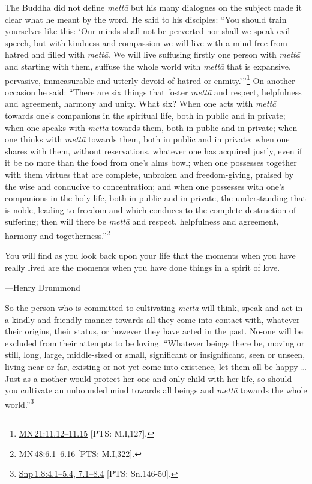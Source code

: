 \documentclass[10pt, openright]{book}
\newenvironment{epigram-2}%
{%
\vspace{1em}
\noindent
\quoting[leftmargin=2.5cm,rightmargin=2.5cm]%
\begin{itshape}
\large
}%
{\end{itshape}\endquoting
}%
\newenvironment{epigram-2-cite}%
{%
\quoting[leftmargin=2.5cm,rightmargin=2.5cm]%
\noindent\normal\hspace*{\fill} 
}%
{\endquoting\vspace{1em}
}%
\begin{document}
The Buddha did not define \textit{mettā} but his many dialogues on the subject made it clear what he meant by the word. He said to his disciples: “You should train yourselves like this: ‘Our minds shall not be perverted nor shall we speak evil speech, but with kindness and compassion we will live with a mind free from hatred and filled with \textit{mettā}. We will live suffusing firstly one person with \textit{mettā} and starting with them, suffuse the whole world with \textit{mettā} that is expansive, pervasive, immeasurable and utterly devoid of hatred or enmity.’”\footnote {\href{https://suttacentral.net/mn21/en/sujato\#11.12}{MN 21:11.12–11.15} [PTS: M.I,127].} On another occasion he said: “There are six things that foster \textit{mettā} and respect, helpfulness and agreement, harmony and unity. What six? When one acts with \textit{mettā} towards one’s companions in the spiritual life, both in public and in private; when one speaks with \textit{mettā} towards them, both in public and in private; when one thinks with \textit{mettā} towards them, both in public and in private; when one shares with them, without reservations, whatever one has acquired justly, even if it be no more than the food from one’s alms bowl; when one possesses together with them virtues that are complete, unbroken and freedom-giving, praised by the wise and conducive to concentration; and when one possesses with one’s companions in the holy life, both in public and in private, the understanding that is noble, leading to freedom and which conduces to the complete destruction of suffering; then will there be \textit{mettā} and respect, helpfulness and agreement, harmony and togetherness.”\footnote {\href{https://suttacentral.net/mn48/en/sujato\#6.1}{MN 48:6.1–6.16} [PTS: M.I,322].}


\begin{epigram-2}
You will find as you look back upon your life that the moments when you have really lived are the moments when you have done things in a spirit of love.
\end{epigram-2}

\begin{epigram-2-cite}
—Henry Drummond
\end{epigram-2-cite}

So the person who is committed to cultivating \textit{mettā} will think, speak and act in a kindly and friendly manner towards all they come into contact with, whatever their origins, their status, or however they have acted in the past. No-one will be excluded from their attempts to be loving. “Whatever beings there be, moving or still, long, large, middle-sized or small, significant or insignificant, seen or unseen, living near or far, existing or not yet come into existence, let them all be happy … Just as a mother would protect her one and only child with her life, so should you cultivate an unbounded mind towards all beings and \textit{mettā} towards the whole world.”\footnote {\href{https://suttacentral.net/snp1.8/en/sujato\#4.1}{Snp 1.8:4.1–5.4, 7.1–8.4} [PTS: Sn.146-50].}
\end{document}
